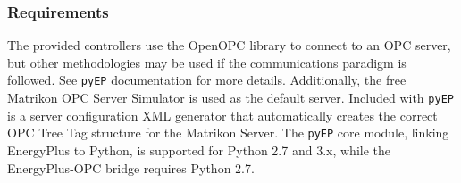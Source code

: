 \subsubsection{Requirements}

The provided controllers use the OpenOPC library to connect to an OPC server, but other methodologies may be used if the communications paradigm is followed. See \texttt{pyEP} documentation for more details.
Additionally, the free Matrikon OPC Server Simulator is used as the default server.
Included with \texttt{pyEP} is a server configuration XML generator that automatically creates the correct OPC Tree Tag structure for the Matrikon Server. 
The \texttt{pyEP} core module, linking EnergyPlus to Python, is supported for Python 2.7 and 3.x, while the EnergyPlus-OPC bridge requires Python 2.7.


